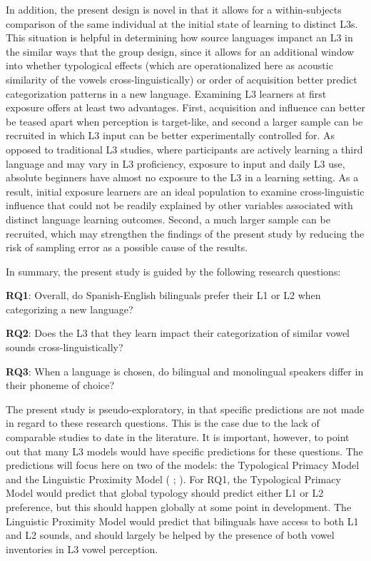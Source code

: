 \documentclass[preprints]{Definitions/mdpi}
\begin{document}
In addition, the present design is novel in that it allows for a within-subjects comparison of the same individual at the initial state of learning to distinct L3s.
This situation is helpful in determining how source languages impanct an L3 in the similar ways that the group design, since it allows for an additional window into whether typological effects (which are operationalized here as acoustic similarity of the vowels cross-linguistically) or order of acquisition better predict categorization patterns in a new language.
Examining L3 learners at first exposure offers at least two advantages.
First, acquisition and influence can better be teased apart when perception is target-like, and second a larger sample can be recruited in which L3 input can be better experimentally controlled for.
As opposed to traditional L3 studies, where participants are actively learning a third language and may vary in L3 proficiency, exposure to input and daily L3 use, absolute beginners have almost no exposure to the L3 in a learning setting.
As a result, initial exposure learners are an ideal population to examine cross-linguistic influence that could not be readily explained by other variables associated with distinct language learning outcomes.
Second, a much larger sample can be recruited, which may strengthen the findings of the present study by reducing the risk of sampling error as a possible cause of the results.

In summary, the present study is guided by the following research questions:

\textbf{RQ1}: Overall, do Spanish-English bilinguals prefer their L1 or L2 when categorizing a new language?

\textbf{RQ2}: Does the L3 that they learn impact their categorization of similar vowel sounds cross-linguistically?

\textbf{RQ3}: When a language is chosen, do bilingual and monolingual speakers differ in their phoneme of choice?

The present study is pseudo-exploratory, in that specific predictions are not made in regard to these research questions.
This is the case due to the lack of comparable studies to date in the literature.
It is important, however, to point out that many L3 models would have specific predictions for these questions.
The predictions will focus here on two of the models: the Typological Primacy Model and the Linguistic Proximity Model (\citeauthor{westergaard_crosslinguistic_2017} \citeyear{westergaard_crosslinguistic_2017};
\citeauthor{westergaard_microvariation_2021} \citeyear{westergaard_microvariation_2021}).
For RQ1, the Typological Primacy Model would predict that global typology should predict either L1 or L2 preference, but this should happen globally at some point in development.
The Linguistic Proximity Model would predict that bilinguals have access to both L1 and L2 sounds, and should largely be helped by the presence of both vowel inventories in L3 vowel perception.
\end{document}
